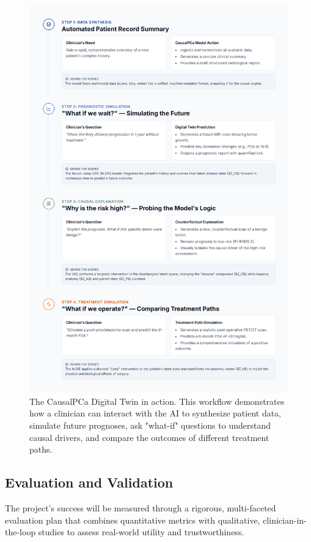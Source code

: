 \documentclass[11pt, a4paper]{article}
\begin{document}
\begin{figure}[H]
    \centering
    \includegraphics[width=\textwidth]{wf.png}
    \caption{The CausalPCa Digital Twin in action. This workflow demonstrates how a clinician can interact with the AI to synthesize patient data, simulate future prognoses, ask "what-if" questions to understand causal drivers, and compare the outcomes of different treatment paths.}
    \label{fig:workflow}
\end{figure}

\subsection{Evaluation and Validation}
The project's success will be measured through a rigorous, multi-faceted evaluation plan that combines quantitative metrics with qualitative, clinician-in-the-loop studies to assess real-world utility and trustworthiness.
\end{document}
